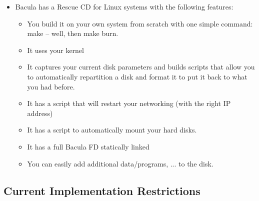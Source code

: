\begin{itemize}
\item Bacula has a Rescue CD for Linux systems with the following features:  
   \begin{itemize}
   \item You build it on your own system from scratch with one simple  command:
      make -- well, then make burn. 
   \item It uses your kernel  
   \item It captures your current disk parameters and builds scripts that  allow
      you to automatically repartition a disk and format it to  put it back to what
      you had before. 
   \item It has a script that will restart your networking (with the right  IP
      address)  
   \item It has a script to automatically mount your hard disks.  
   \item It has a full Bacula FD statically linked  
   \item You can easily add additional data/programs, ... to the disk.  
   \end{itemize}

\end{itemize}

\subsection*{Current Implementation Restrictions}

